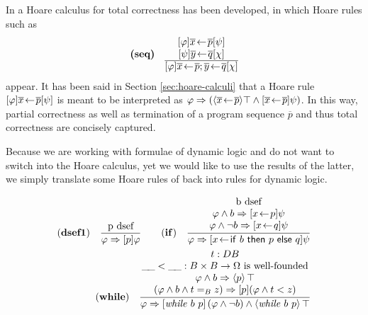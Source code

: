 In \cite{SchroederMossakowski:PDL} a Hoare calculus for total correctness has been
developed, in which Hoare rules such as
\[
\text{\bf (seq)}\quad
\begin{array}{@{}c@{}}
[\varphi]\overline{x} \leteq \overline{p}[\psi] \\
{}[\psi]\overline{y} \leteq \overline{q}[\chi] \\\hline
{}[\varphi]\overline{x} \leteq \overline{p}; \overline{y} \leteq \overline{q}[\chi]
\end{array}
\]
appear. It has been said in Section \ref{sec:hoare-calculi} that a Hoare rule
$[\varphi]\overline{x} \!\gets\! \overline{p}[\psi]$ is meant to be interpreted as $\varphi \Rightarrow
(\langle\overline{x} \!\gets\! \overline{p}\rangle\top \land [\overline{x} \!\gets\! \overline{p}]\psi)$. In
this way, partial correctness as well as termination of a program sequence
$\overline{p}$ and thus total correctness are concisely captured.

Because we are working with formulae of dynamic logic and do not want to switch
into the Hoare calculus, yet we would like to use the results of the latter, we
simply translate some Hoare rules of \cite{SchroederMossakowski:PDL} 
back into rules for dynamic logic.

\begin{eqnarray*}
\NRule{dsef1}{\text{p dsef}}{\varphi \Rightarrow [p]\varphi}
\qquad
\NRule{if}{\begin{array}{@{}c@{}}
             \text{b dsef}\\
             \varphi \land b \Rightarrow [x \leteq p]\psi\\
             \varphi \land \lnot b \Rightarrow [x \leteq q]\psi
           \end{array}}
           {\varphi \Rightarrow [x \leteq \IfTerm{b}{p}{q}]\psi}
\\
% 
\NRule{while}{\begin{array}{@{}c@{}}
                t : DB\\
                \Arg < \Arg : B \times B \to \Omega \text{ is well-founded}\\
                \varphi \land b \Rightarrow \PDLDmd{p}{\top}\\
                (\varphi \land b \land t =_B z) \Rightarrow [p](\varphi \land t < z) \end{array}}
     {\varphi \Rightarrow \PDLBox{\WhileTerm{b}{p}}{(\varphi \land \lnot b)} \land \PDLDmd{\WhileTerm{b}{p}}{\top}}
\end{eqnarray*}

